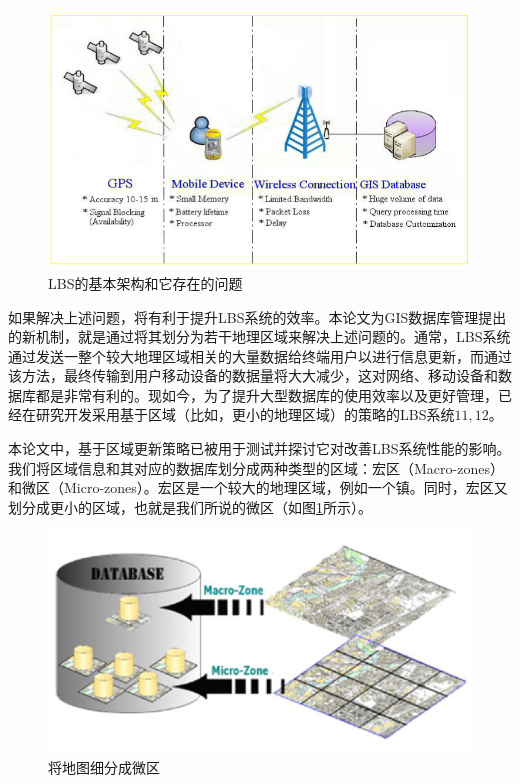 \documentclass{article}
\begin{document}
\begin{CJK}{UTF8}{gbsn}
	\begin{figure}[htbp]
		\centering
		\includegraphics[bb=0 0 722 455, scale=0.45]{figure/fig01.png}
		\caption{LBS的基本架构和它存在的问题}
	\end{figure}

	如果解决上述问题，将有利于提升LBS系统的效率。本论文为GIS数据库管理提出的新机制，就是通过将其划分为若干地理区域来解决上述问题的。通常，LBS系统通过发送一整个较大地理区域相关的大量数据给终端用户以进行信息更新，而通过该方法，最终传输到用户移动设备的数据量将大大减少，这对网络、移动设备和数据库都是非常有利的。现如今，为了提升大型数据库的使用效率以及更好管理，已经在研究开发采用基于区域（比如，更小的地理区域）的策略的LBS系统$11,12$。

	本论文中，基于区域更新策略已被用于测试并探讨它对改善LBS系统性能的影响。我们将区域信息和其对应的数据库划分成两种类型的区域：宏区（Macro-zones）和微区（Micro-zones）。宏区是一个较大的地理区域，例如一个镇。同时，宏区又划分成更小的区域，也就是我们所说的微区（如图\ref{fig:dividing-the-map-into-micro-zones}所示）。

	\begin{figure}[htbp]
		\centering
		\includegraphics[bb=0 0 700 366, scale=0.45]{figure/fig02.png}
		\caption{将地图细分成微区}
		\label{fig:dividing-the-map-into-micro-zones}
	\end{figure}


\end{CJK}
\end{document}
